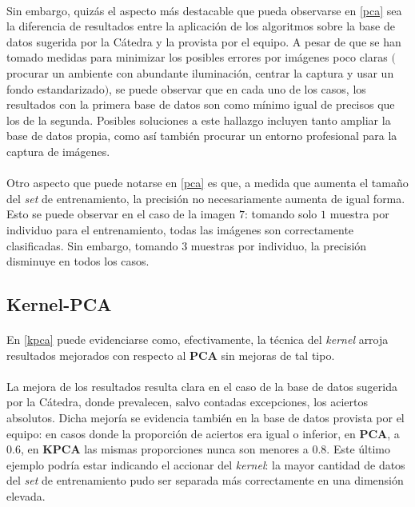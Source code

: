 \documentclass[12pt, twocolumn]{article}
\begin{document}
	\paragraph{} Sin embargo, quizás el aspecto más destacable que pueda observarse en \ref{pca} sea la diferencia de resultados entre la aplicación de los algoritmos sobre la base de datos sugerida por la Cátedra y la provista por el equipo. A pesar de que se han tomado medidas para minimizar los posibles errores por imágenes poco claras $($procurar un ambiente con abundante iluminación, centrar la captura y usar un fondo estandarizado$)$, se puede observar que en cada uno de los casos, los resultados con la primera base de datos son como mínimo igual de precisos que los de la segunda. Posibles soluciones a este hallazgo incluyen tanto ampliar la base de datos propia, como así también procurar un entorno profesional para la captura de imágenes.  
	
	\paragraph{} Otro aspecto que puede notarse en \ref{pca} es que, a medida que aumenta el tamaño del \textit{set} de entrenamiento, la precisión no necesariamente aumenta de igual forma. Esto se puede observar en el caso de la imagen $7$: tomando solo $1$ muestra por individuo para el entrenamiento, todas las imágenes son correctamente clasificadas. Sin embargo, tomando $3$ muestras por individuo, la precisión disminuye en todos los casos.
		
	\subsection{Kernel-PCA}
	
	\paragraph{} En \ref{kpca} puede evidenciarse como, efectivamente, la técnica del \textit{kernel} arroja resultados mejorados con respecto al \textbf{PCA} sin mejoras de tal tipo. 
	
	\paragraph{} La mejora de los resultados resulta clara en el caso de la base de datos sugerida por la Cátedra, donde prevalecen, salvo contadas excepciones, los aciertos absolutos. Dicha mejoría se evidencia también en la base de datos provista por el equipo: en casos donde la proporción de aciertos era igual o inferior, en \textbf{PCA}, a $0.6$, en \textbf{KPCA} las mismas proporciones nunca son menores a $0.8$. Este último ejemplo podría estar indicando el accionar del \textit{kernel}: la mayor cantidad de datos del \textit{set} de entrenamiento pudo ser separada más correctamente en una dimensión elevada.
	
\end{document}
